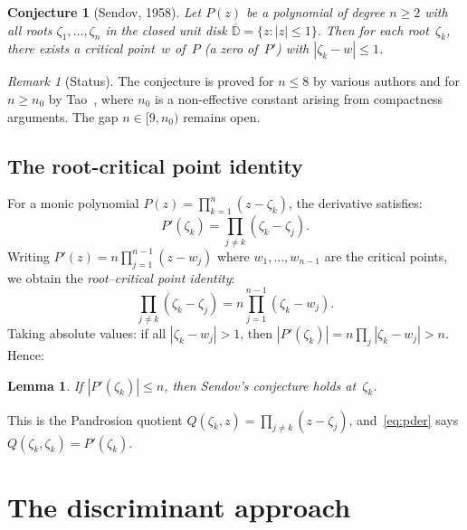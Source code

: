 \documentclass[11pt,a4paper]{article}
\newtheorem{lemma}[theorem]{Lemma}
\newtheorem{conjecture}[theorem]{Conjecture}
\theoremstyle{definition}
\theoremstyle{remark}
\newtheorem{remark}[theorem]{Remark}
\begin{document}
\begin{conjecture}[Sendov, 1958]
\label{conj:sendov}
Let $P(z)$ be a polynomial of degree $n \geq 2$ with all roots $\zeta_1, \ldots, \zeta_n$ in the closed unit disk $\overline{\mathbb{D}} = \{z : |z| \leq 1\}$.  Then for each root~$\zeta_k$, there exists a critical point~$w$ of~$P$ (a zero of~$P'$) with $|\zeta_k - w| \leq 1$.
\end{conjecture}

\begin{remark}[Status]
The conjecture is proved for $n \leq 8$ by various authors and for $n \geq n_0$ by Tao~\cite{Tao2020}, where $n_0$ is a non-effective constant arising from compactness arguments.  The gap $n \in [9, n_0)$ remains open.
\end{remark}

\subsection{The root-critical point identity}

For a monic polynomial $P(z) = \prod_{k=1}^n (z - \zeta_k)$, the derivative satisfies:
\begin{equation}
\label{eq:pder}
P'(\zeta_k) = \prod_{j \neq k} (\zeta_k - \zeta_j).
\end{equation}
Writing $P'(z) = n \prod_{j=1}^{n-1} (z - w_j)$ where $w_1, \ldots, w_{n-1}$ are the critical points, we obtain the \emph{root--critical point identity}:
\begin{equation}
\label{eq:identity}
\prod_{j \neq k} (\zeta_k - \zeta_j) = n \prod_{j=1}^{n-1} (\zeta_k - w_j).
\end{equation}
Taking absolute values: if all $|\zeta_k - w_j| > 1$, then $|P'(\zeta_k)| = n \prod_j |\zeta_k - w_j| > n$.  Hence:

\begin{lemma}
\label{lem:key}
If $|P'(\zeta_k)| \leq n$, then Sendov's conjecture holds at~$\zeta_k$.
\end{lemma}

This is the Pandrosion quotient $Q(\zeta_k, z) = \prod_{j \neq k}(z - \zeta_j)$, and~\eqref{eq:pder} says $Q(\zeta_k, \zeta_k) = P'(\zeta_k)$.

\section{The discriminant approach}
\label{sec:disc}
\end{document}
